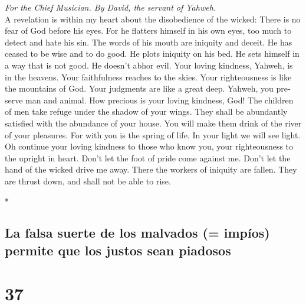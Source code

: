 \begin{paracol}{2}
\begin{otherlanguage}{english}
\emph{For the Chief Musician. By David, the servant of Yahweh.}\\
 A revelation is within my heart about the disobedience of
the wicked: There is no fear of God before his eyes.  For
he flatters himself in his own eyes, too much to detect and hate his
sin.  The words of his mouth are iniquity and deceit. He
has ceased to be wise and to do good.  He plots iniquity
on his bed. He sets himself in a way that is not good. He doesn't abhor
evil.  Your loving kindness, Yahweh, is in the heavens.
Your faithfulness reaches to the skies.  Your
righteousness is like the mountains of God. Your judgments are like a
great deep. Yahweh, you preserve man and animal.  How
precious is your loving kindness, God! The children of men take refuge
under the shadow of your wings.  They shall be abundantly
satisfied with the abundance of your house. You will make them drink of
the river of your pleasures.  For with you is the spring
of life. In your light we will see light.  Oh continue
your loving kindness to those who know you, your righteousness to the
upright in heart.  Don't let the foot of pride come
against me. Don't let the hand of the wicked drive me away.
 There the workers of iniquity are fallen. They are
thrust down, and shall not be able to rise.

\end{otherlanguage}

\switchcolumn[0]*

\hypertarget{la-falsa-suerte-de-los-malvados-impuxedos-permite-que-los-justos-sean-piadosos}{%
\subsection{La falsa suerte de los malvados (= impíos) permite que los
justos sean
piadosos}\label{la-falsa-suerte-de-los-malvados-impuxedos-permite-que-los-justos-sean-piadosos}}

\hypertarget{section-72}{%
\section{37}\label{section-72}}


\end{paracol}

